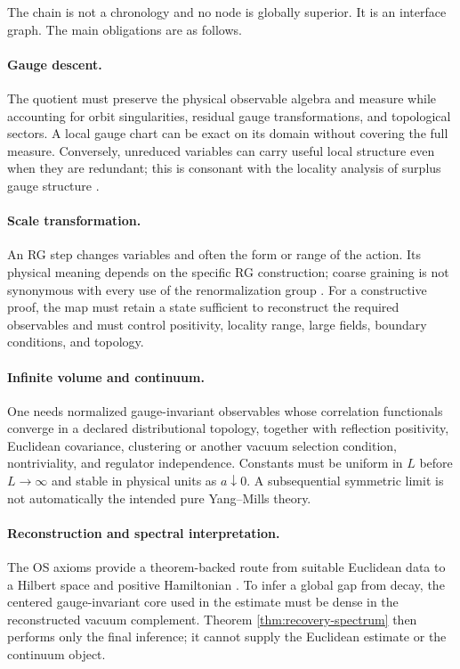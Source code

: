 The chain is not a chronology and no node is globally superior.  It is an
interface graph.  The main obligations are as follows.

\paragraph{Gauge descent.}
The quotient must preserve the physical observable algebra and measure while
accounting for orbit singularities, residual gauge transformations, and
topological sectors.  A local gauge chart can be exact on its domain without
covering the full measure.  Conversely, unreduced variables can carry useful
local structure even when they are redundant; this is consonant with the
locality analysis of surplus gauge structure
\cite{NguyenTehWells2020}.

\paragraph{Scale transformation.}
An RG step changes variables and often the form or range of the action.  Its
physical meaning depends on the specific RG construction; coarse graining is
not synonymous with every use of the renormalization group
\cite{KoberinskiFraser2023}.  For a constructive proof, the map must retain a
state sufficient to reconstruct the required observables and must control
positivity, locality range, large fields, boundary conditions, and topology.

\paragraph{Infinite volume and continuum.}
One needs normalized gauge-invariant observables whose correlation
functionals converge in a declared distributional topology, together with
reflection positivity, Euclidean covariance, clustering or another vacuum
selection condition, nontriviality, and regulator independence.  Constants
must be uniform in $L$ before $L\to\infty$ and stable in physical units as
$a\downarrow0$.  A subsequential symmetric limit is not automatically the
intended pure Yang--Mills theory.

\paragraph{Reconstruction and spectral interpretation.}
The OS axioms provide a theorem-backed route from suitable Euclidean data to
a Hilbert space and positive Hamiltonian
\cite{OsterwalderSchrader1973,OsterwalderSchrader1975}.  To infer a global gap
from decay, the centered gauge-invariant core used in the estimate must be
dense in the reconstructed vacuum complement.  Theorem
\ref{thm:recovery-spectrum} then performs only the final inference; it cannot
supply the Euclidean estimate or the continuum object.

